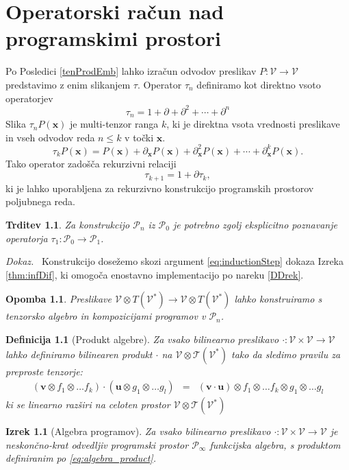 \documentclass[a4paper, 12pt]{book}
\newcommand{\T}{\mathcal{T}}
\newcommand{\VV}{\mathcal{V}}
\newcommand{\x}{\mathbf{x}}
\newcommand{\uu}{\mathbf{u}}
\newcommand{\vv}{\mathbf{v}}
\newcommand{\dP}{\mathcal{P}}
\newcommand{\D}{\partial}
\newcommand{\sumd}{\tau}
\newtheorem{izrek}{Izrek}[chapter]
\newtheorem{opomba}{Opomba}[chapter]
\newtheorem{definicija}{Definicija}[chapter]
\newtheorem{trditev}{Trditev}[izrek]
\newenvironment{dokaz}{\emph{Dokaz.}\ }{\hspace{\fill}{$\Box$}}
\begin{document}
\chapter{Operatorski račun nad programskimi prostori}\label{ch:opRac}

Po Posledici \ref{tenProdEmb} lahko izračun odvodov preslikav $P:\VV\to\VV$ predstavimo z enim slikanjem $\sumd$. Operator $\sumd_n$ definiramo kot direktno vsoto operatorjev
\begin{equation}
\label{tau}
\sumd_n=1+\D+\D^2+\cdots+\D^n
\end{equation}
Slika $\sumd_n P(\x)$ je multi-tenzor ranga $k$, ki je direktna vsota vrednosti preslikave in vseh odvodov reda $n\le k$ v točki $\x$.
\begin{equation}
  \label{eq:multi_odvod}
  \sumd_kP(\x) = P(\mathbf{x})+\partial_\mathbf{x} P(\mathbf{x}) + \partial^2_\mathbf{x} P(\mathbf{x}) + \cdots + \partial^k_\mathbf{x} P(\mathbf{x}).
\end{equation}
Tako operator zadošča rekurzivni relaciji
\begin{equation}\label{DDrek}
\sumd_{k+1}=1+\D\sumd_k,
\end{equation}
ki je lahko uporabljena za rekurzivno konstrukcijo programskih prostorov poljubnega reda.

\begin{trditev}\label{impl}
Za konstrukcijo $\dP_n$ iz $\dP_0$ je potrebno zgolj eksplicitno poznavanje operatorja $\sumd_1:\dP_0\to\dP_1$.
\end{trditev}
\begin{dokaz}
Konstrukcijo dosežemo skozi argument \eqref{eq:inductionStep} dokaza Izreka \ref{thm:infDif}, ki omogoča enostavno implementacijo po nareku \eqref{DDrek}.
\end{dokaz}
\begin{opomba}
Preslikave $\VV\otimes T(\VV^*)\to\VV\otimes T(\VV^*)$ lahko konstruiramo s tenzorsko algebro in kompozicijami programov v $\dP_n$.
\end{opomba}

\begin{definicija}[Produkt algebre]
 Za vsako bilinearno preslikavo $\cdot :\VV\times \VV\to \VV$ lahko definiramo bilinearen produkt $\cdot$ na $\VV\otimes \T(\VV^*)$ tako da sledimo pravilu za preproste tenzorje:
 \begin{eqnarray}
   \label{eq:algebra_product}
   (\vv\otimes f_1\otimes\ldots f_k) \cdot (\uu\otimes g_1\otimes\ldots g_l) &=& 
(\vv\cdot \uu)\otimes f_1\otimes\ldots f_k\otimes g_1\otimes\ldots g_l 
 \end{eqnarray}
ki se linearno razširi na celoten prostor $\VV\otimes\T(\VV^*)$
\end{definicija}
\begin{izrek}[Algebra programov]\label{izr:alg}
 Za vsako bilinearno preslikavo $\cdot :\VV\times \VV\to \VV$ je neskončno-krat odvedljiv programski prostor $\dP_\infty$ funkcijska algebra, s produktom definiranim po \eqref{eq:algebra_product}.
\end{izrek}
\end{document}
